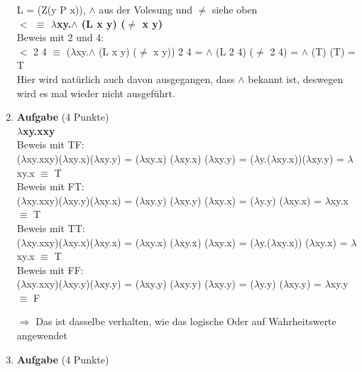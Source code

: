 \documentclass[11pt]{article}
\newcommand{\punkte}[1]{{\small{ }(#1 Punkte)}}
\newcommand{\aufgabe}[1]{\item{\bf #1}}
\begin{document}
\begin{enumerate}
L = (Z(y P x)), $\land$ aus der Volesung und $\neq$ siehe oben\\
\textbf{$<$ $\equiv$ $\lambda$xy.$\land$ (L x y) ($\neq$ x y)}\\
Beweis mit 2 und 4:\\
$<$ 2 4 $\equiv$ ($\lambda$xy.$\land$ (L x y) ($\neq$ x y)) 2 4 = $\land$ (L 2 4) ($\neq$ 2 4) = $\land$ (T) (T) = T\\

Hier wird natürlich auch davon ausgegangen, dass $\land$ bekannt ist, deswegen wird es mal wieder nicht ausgeführt.\\
\newpage
\aufgabe{Aufgabe}\punkte{4}\\
\textbf{$\lambda$xy.xxy}\\
Beweis mit TF:\\
($\lambda$xy.xxy)($\lambda$xy.x)($\lambda$xy.y) = ($\lambda$xy.x) ($\lambda$xy.x) ($\lambda$xy.y) = ($\lambda$y.($\lambda$xy.x))($\lambda$xy.y) = $\lambda$xy.x $\equiv$ T\\
Beweis mit FT:\\
($\lambda$xy.xxy)($\lambda$xy.y)($\lambda$xy.x) = ($\lambda$xy.y) ($\lambda$xy.y) ($\lambda$xy.x) = ($\lambda$y.y) ($\lambda$xy.x) = $\lambda$xy.x $\equiv$ T\\
Beweis mit TT:\\
($\lambda$xy.xxy)($\lambda$xy.x)($\lambda$xy.x) = ($\lambda$xy.x) ($\lambda$xy.x) ($\lambda$xy.x) = ($\lambda$y.($\lambda$xy.x)) ($\lambda$xy.x) = $\lambda$xy.x $\equiv$ T\\
Beweis mit FF:\\
($\lambda$xy.xxy)($\lambda$xy.y)($\lambda$xy.y) = ($\lambda$xy.y) ($\lambda$xy.y) ($\lambda$xy.y) = ($\lambda$y.y) ($\lambda$xy.y) = $\lambda$xy.y $\equiv$ F 

$\Rightarrow$ Das ist dasselbe verhalten, wie das logische Oder auf Wahrheitswerte angewendet
\aufgabe{Aufgabe}\punkte{4}


\end{enumerate}
\end{document}
